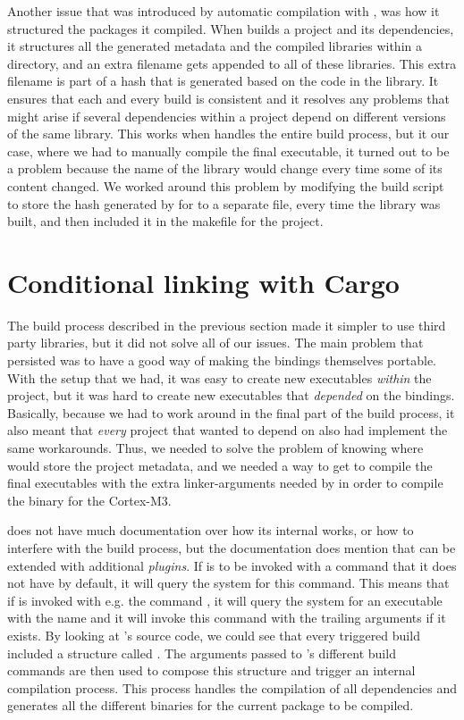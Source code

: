 Another issue that was introduced by automatic compilation with {\cargo}, was how it structured the packages it compiled.
When {\cargo} builds a project and its dependencies, it structures all the generated metadata and the compiled libraries within a  directory, and an extra filename gets appended to all of these libraries.
This extra filename is part of a hash that is generated based on the code in the library.
It ensures that each and every build is consistent and it resolves any problems that might arise if several dependencies within a project depend on different versions of the same library.
This works when {\cargo} handles the entire build process, but it our case, where we had to manually compile the final executable, it turned out to be a problem because the name of the library would change every time some of its content changed.
We worked around this problem by modifying the build script to store the hash generated by {\cargo} for {\emlib} to a separate file, every time the library was built, and then included it in the makefile for the project.

\section{Conditional linking with Cargo}

The build process described in the previous section made it simpler to use third party libraries, but it did not solve all of our issues.
The main problem that persisted was to have a good way of making the bindings themselves portable.
With the setup that we had, it was easy to create new executables \emph{within} the project, but it was hard to create new executables that \emph{depended} on the bindings.
Basically, because we had to work around {\cargo} in the final part of the build process, it also meant that \emph{every} project that wanted to depend on {\emlib} also had implement the same workarounds.
Thus, we needed to solve the problem of knowing where {\cargo} would store the project metadata, and we needed a way to get {\cargo} to compile the final executables with the extra linker-arguments needed by {\rustc} in order to compile the binary for the Cortex-M3.

{\cargo} does not have much documentation over how its internal works, or how to interfere with the build process, but the documentation does mention that {\cargo} can be extended with additional \emph{plugins}.
If {\cargo} is to be invoked with a command that it does not have by default, it will query the system for this command.
This means that if {\cargo} is invoked with e.g. the command , it will query the system for an executable with the name  and it will invoke this command with the trailing arguments if it exists.
By looking at {\cargo}'s source code, we could see that every triggered build included a structure called .
The arguments passed to {\cargo}'s different build commands are then used to compose this structure and trigger an internal compilation process.
This process handles the compilation of all dependencies and generates all the different binaries for the current package to be compiled.


